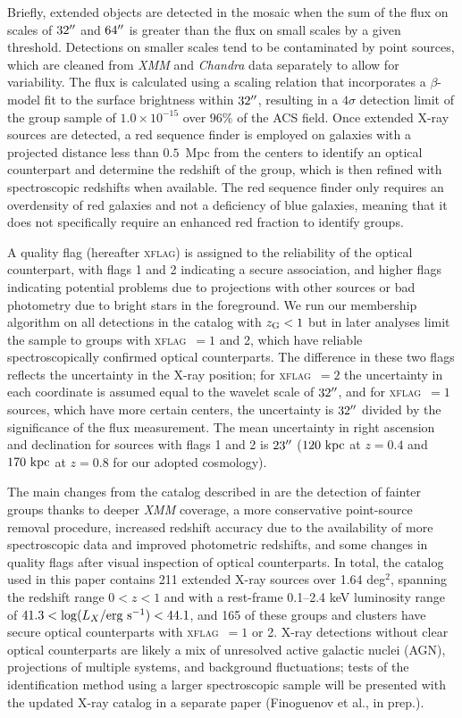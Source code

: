 Briefly, extended objects
are detected in the mosaic when the sum of the flux on scales of
$32\mbox{$^{\prime\prime}$}$ and $64\mbox{$^{\prime\prime}$}$ is greater than the flux on small scales
by a given threshold. Detections on smaller scales tend to be
contaminated by point sources, which are cleaned from {\sl XMM} and {\sl Chandra}
data separately to allow for variability. The flux is calculated using a
scaling relation that incorporates a $\beta$-model fit to the surface
brightness within $32\mbox{$^{\prime\prime}$}$, resulting in a $4\sigma$ detection
limit of the group sample of $1.0\times 10^{-15}$ \flux over $96\%$ of
the ACS field. Once extended X-ray sources are detected, a red
sequence finder is employed on galaxies with a projected distance less
than $0.5$~Mpc from the centers to identify an optical counterpart and
determine the redshift of the group, which is then refined with
spectroscopic redshifts when available. The red sequence finder only
requires an overdensity of red galaxies and not a deficiency of blue
galaxies, meaning that it does not specifically require an enhanced
red fraction to identify groups.

A quality flag (hereafter \textsc{xflag}) is assigned to the
reliability of the optical counterpart, with 
flags 1 and 2 indicating a secure association, and higher flags
indicating potential problems due to projections with other sources or
bad photometry due to bright stars in the foreground. We
run our membership algorithm on all detections in the catalog with
$\mbox{$z_{\rm G}$}<1$ but in later analyses limit the sample to groups with
\textsc{xflag}~$=1$ and 2, which have reliable spectroscopically confirmed optical
counterparts. The difference in these two flags 
reflects the uncertainty in the X-ray position; for \textsc{xflag}~$=2$ the
uncertainty in each coordinate is assumed equal to the wavelet scale
of $32\mbox{$^{\prime\prime}$}$, and for \textsc{xflag}~$=1$ sources, which have more certain centers,
the uncertainty is $32\mbox{$^{\prime\prime}$}$ divided by the significance of the flux
measurement. The mean uncertainty in right ascension and declination
for sources with flags 1 and 2 is $23\mbox{$^{\prime\prime}$}$ ($120~\rm{kpc}$ at
$z=0.4$ and $170~\rm{kpc}$ at $z=0.8$ for our adopted cosmology).

The main changes from the catalog described in \citet{Finoguenov2007}
are the detection of fainter groups thanks to deeper {\sl XMM}
coverage, a more conservative point-source removal procedure,
increased redshift accuracy due to the availability of more
spectroscopic data and improved photometric redshifts, and some
changes in quality flags after visual inspection of optical
counterparts. In total, the catalog used in this paper contains 211
extended X-ray sources over 1.64 deg$^2$, spanning the
redshift range $0<z<1$ and with a rest-frame 0.1--2.4 keV luminosity
range of $41.3<\log(L_X/\mbox{erg s$^{-1}$})<44.1$, and 165 of these groups and
clusters have secure optical counterparts with \textsc{xflag}~$=1$ or
2. X-ray detections without clear optical counterparts are likely a
mix of unresolved active galactic nuclei (AGN), projections of
multiple systems, and background fluctuations; tests of the
identification method using a larger spectroscopic sample will be
presented with the updated X-ray catalog in a separate paper
(Finoguenov et al., in prep.).

